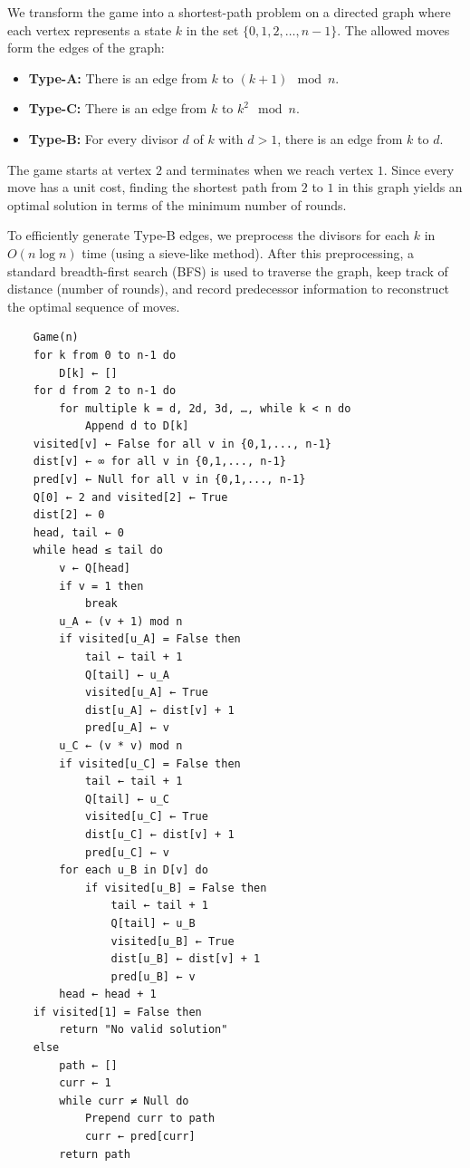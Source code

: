 \documentclass[letterpaper, 11pt]{article}
\newcommand{\1}{\mathds{1}}	%
\theoremstyle{definition}
\newenvironment{solution}{{\par\noindent\it Solution.}}{}
\begin{document}
\begin{solution}
    We transform the game into a shortest-path problem on a directed graph where each vertex represents a state \( k \) in the set \(\{0, 1, 2, \dots, n-1\}\). The allowed moves form the edges of the graph:
    \begin{itemize}
        \item \textbf{Type-A:} There is an edge from \( k \) to \((k+1) \mod n\).
        \item \textbf{Type-C:} There is an edge from \( k \) to \( k^2 \mod n\).
        \item \textbf{Type-B:} For every divisor \( d \) of \( k \) with \( d > 1 \), there is an edge from \( k \) to \( d \).
    \end{itemize}
    The game starts at vertex \(2\) and terminates when we reach vertex \(1\). Since every move has a unit cost, finding the shortest path from \(2\) to \(1\) in this graph yields an optimal solution in terms of the minimum number of rounds.
    
    To efficiently generate Type-B edges, we preprocess the divisors for each \( k \) in \( O(n \log n) \) time (using a sieve-like method). After this preprocessing, a standard breadth-first search (BFS) is used to traverse the graph, keep track of distance (number of rounds), and record predecessor information to reconstruct the optimal sequence of moves.
\begin{lstlisting}
    Game(n)
    for k from 0 to n-1 do
        D[k] ← [] 
    for d from 2 to n-1 do
        for multiple k = d, 2d, 3d, …, while k < n do
            Append d to D[k]
    visited[v] ← False for all v in {0,1,..., n-1}
    dist[v] ← ∞ for all v in {0,1,..., n-1}
    pred[v] ← Null for all v in {0,1,..., n-1}
    Q[0] ← 2 and visited[2] ← True
    dist[2] ← 0
    head, tail ← 0
    while head ≤ tail do
        v ← Q[head]
        if v = 1 then
            break  
        u_A ← (v + 1) mod n
        if visited[u_A] = False then
            tail ← tail + 1
            Q[tail] ← u_A
            visited[u_A] ← True
            dist[u_A] ← dist[v] + 1
            pred[u_A] ← v
        u_C ← (v * v) mod n
        if visited[u_C] = False then
            tail ← tail + 1
            Q[tail] ← u_C
            visited[u_C] ← True
            dist[u_C] ← dist[v] + 1
            pred[u_C] ← v
        for each u_B in D[v] do
            if visited[u_B] = False then
                tail ← tail + 1
                Q[tail] ← u_B
                visited[u_B] ← True
                dist[u_B] ← dist[v] + 1
                pred[u_B] ← v
        head ← head + 1
    if visited[1] = False then
        return "No valid solution"  
    else
        path ← []
        curr ← 1
        while curr ≠ Null do
            Prepend curr to path
            curr ← pred[curr]
        return path
\end{lstlisting}

\end{solution}
\end{document}
